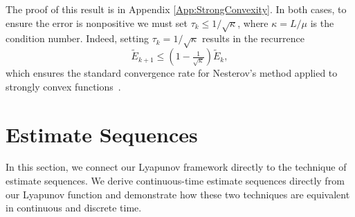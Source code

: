 \documentclass[11pt]{article}
\theoremstyle{plain}
\begin{document}
The proof of this result is in Appendix \ref{App:StrongConvexity}. In both cases, to ensure the error is nonpositive we must set  $\tau_k\leq 1/\sqrt{\kappa}$, where $\kappa = L/\mu$ is the condition number.  Indeed, setting $\tau_k = 1/\sqrt{\kappa}$ results in the recurrence
\[
\tilde E_{k+1} \leq \left(1-\tfrac{1}{\sqrt{\kappa}}\right) \tilde  E_k, 
\]
which ensures the standard convergence rate for Nesterov's method applied to strongly convex functions~\cite{Nesterov04}.

\section{Estimate Sequences}

In this section, we connect our Lyapunov framework directly to the technique of estimate sequences.  We derive continuous-time estimate sequences directly from our Lyapunov function and demonstrate how these two techniques are equivalent in continuous and discrete time.
\end{document}
